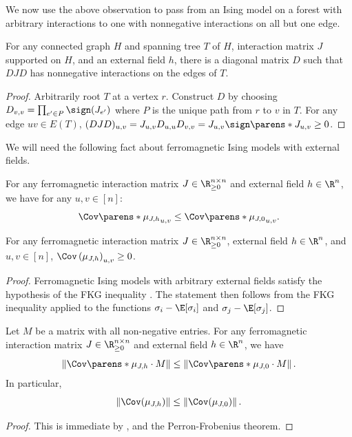\documentclass[11pt,letterpaper]{article}
\begin{document}
    We now use the above observation to pass from an Ising model on a forest with arbitrary interactions to one with nonnegative interactions on all but one edge. 
    \begin{lemma}   \label{lem:all-but-one-neg}
        For any connected graph $H$ and spanning tree $T$ of $H$, interaction matrix $J$ supported on $H$, and an external field $h$, there is a diagonal matrix $D$ such that $DJD$ has nonnegative interactions on the edges of $T$.
    \end{lemma}
    \begin{proof}
        Arbitrarily root $T$ at a vertex $r$.
        Construct $D$ by choosing $D_{v,v} = \prod_{e'\in P} \sign(J_{e'})$ where $P$ is the unique path from $r$ to $v$ in $T$.
        For any edge $uv\in E(T)$, $(DJD)_{u,v} = J_{u,v} D_{u,u} D_{v,v} = J_{u,v} \sign\parens*{J_{u,v}} \ge 0$.
    \end{proof}


    We will need the following fact about ferromagnetic Ising models with external fields.

    \begin{lemma}   \label{lem:cov-ferro-external}
        For any ferromagnetic interaction matrix $J\in\R_{\ge 0}^{n\times n}$ and external field $h\in\R^n$, we have for any $u,v\in[n]$:
        \[
            \Cov\parens*{\mu_{J,h}}_{u,v} \le \Cov\parens*{\mu_{J,0}}_{u,v}.
        \]
    \end{lemma}

    \begin{fact}
        \label{fact:ferro-nonneg-correlation}
        For any ferromagnetic interaction matrix $J \in \R_{\ge 0}^{n \times n}$, external field $h \in \R^n$, and $u,v \in [n]$, $\Cov\left( \mu_{J,h} \right)_{u,v} \ge 0$.
    \end{fact}
    \begin{proof}
        Ferromagnetic Ising models with arbitrary external fields satisfy the hypothesis of the FKG inequality \cite[Theorem 2.16]{gri06}.
        The statement then follows from the FKG inequality applied to the functions $\sigma_i - \E[\sigma_i]$ and $\sigma_j - \E[\sigma_j]$.
    \end{proof}

    \begin{corollary}
        \label{cor:cov-ferro-external-psd}
        Let $M$ be a matrix with all non-negative entries. For any ferromagnetic interaction matrix $J\in\R_{\ge 0}^{n\times n}$ and external field $h\in\R^n$, we have
        \[
            \left\|\Cov\parens*{\mu_{J,h}} \cdot M\right\| \le \left\|\Cov\parens*{\mu_{J,0}} \cdot M\right\|.
        \]
        In particular,
        \[ \left\|\Cov(\mu_{J,h})\right\| \le \left\|\Cov(\mu_{J,0})\right\|. \]
    \end{corollary}
    \begin{proof}
        This is immediate by , and the Perron-Frobenius theorem.
    \end{proof}
\end{document}
